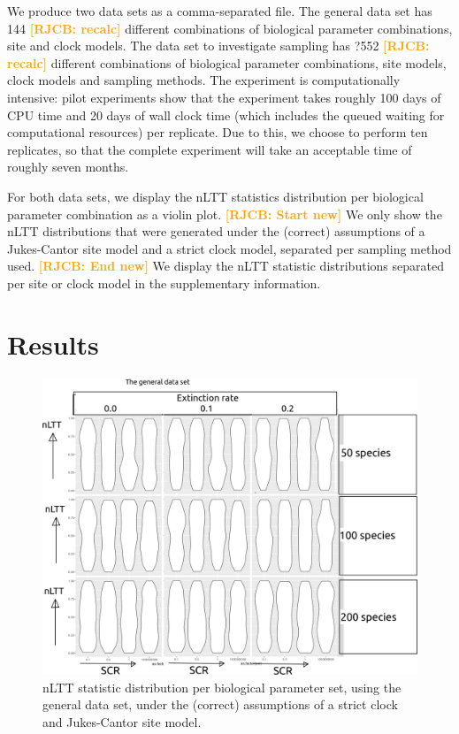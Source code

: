 \documentclass{article}
\newcommand*\richel[1]{\textcolor{orange}{\textbf{[RJCB: #1]}}}
\begin{document}
We produce two data sets as a comma-separated file.
The general data set has 144 \richel{recalc} different combinations
of biological parameter combinations, site and clock models.
The data set to investigate sampling has ?552 \richel{recalc} different combinations
of biological parameter combinations, site models, clock models 
and sampling methods. The experiment is computationally intensive:
pilot experiments show that the experiment takes roughly 100 days
of CPU time and 20 days of wall clock time (which includes the queued 
waiting for computational resources) per replicate. 
Due to this, we choose to perform ten replicates, so that the complete
experiment will take an acceptable time of roughly seven months. 

For both data sets, we display the nLTT statistics distribution per
biological parameter combination as a violin plot.
\richel{Start new}
We only show the nLTT distributions
that were generated under the (correct) assumptions of a Jukes-Cantor site model
and a strict clock model, separated per sampling method used. 
\richel{End new}
We display the nLTT statistic distributions separated per site or clock model 
in the supplementary information.

\section{Results}

\begin{figure}[!htbp]
  \includegraphics[width=\textwidth]{fig_general.png}
  \caption{
    nLTT statistic distribution per biological parameter set, using the
    general data set, 
    under the (correct) assumptions of a strict clock and Jukes-Cantor site model.
  }
\end{figure}
\end{document}
